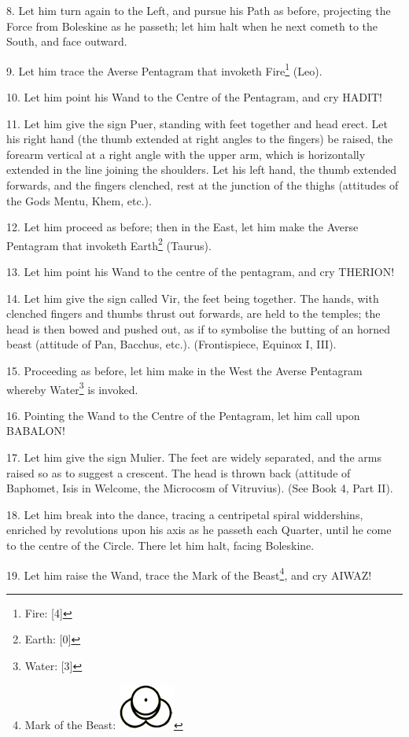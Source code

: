 8. Let him turn again to the Left, and pursue his Path as before, projecting the Force from Boleskine as he passeth; let him halt when he next cometh to the South, and face outward.

9. Let him trace the Averse Pentagram that invoketh Fire\footnote{Fire: [4]} (Leo).

10. Let him point his Wand to the Centre of the Pentagram, and cry HADIT!

11. Let him give the sign Puer, standing with feet together and head erect. Let his right hand (the thumb extended at right angles to the fingers) be raised, the forearm vertical at a right angle with the upper arm, which is horizontally extended in the line joining the shoulders. Let his left hand, the thumb extended forwards, and the fingers clenched, rest at the junction of the thighs (attitudes of the Gods Mentu, Khem, etc.).

12. Let him proceed as before; then in the East, let him make the Averse Pentagram that invoketh Earth\footnote{Earth: [0]} (Taurus).

13. Let him point his Wand to the centre of the pentagram, and cry THERION!

14. Let him give the sign called Vir, the feet being together. The hands, with clenched fingers and thumbs thrust out forwards, are held to the temples; the head is then bowed and pushed out, as if to symbolise the butting of an horned beast (attitude of Pan, Bacchus, etc.). (Frontispiece, Equinox I, III).

15. Proceeding as before, let him make in the West the Averse Pentagram whereby Water\footnote{Water: [3]} is invoked.

16. Pointing the Wand to the Centre of the Pentagram, let him call upon BABALON!

17. Let him give the sign Mulier. The feet are widely separated, and the arms raised so as to suggest a crescent. The head is thrown back (attitude of Baphomet, Isis in Welcome, the Microcosm of Vitruvius). (See Book 4, Part II).

18. Let him break into the dance, tracing a centripetal spiral widdershins, enriched by revolutions upon his axis as he passeth each Quarter, until he come to the centre of the Circle. There let him halt, facing Boleskine.

19. Let him raise the Wand, trace the Mark of the Beast\footnote{Mark of the Beast: \includegraphics[scale=0.4]{images/motb}\footnotemark}, and cry AIWAZ!

